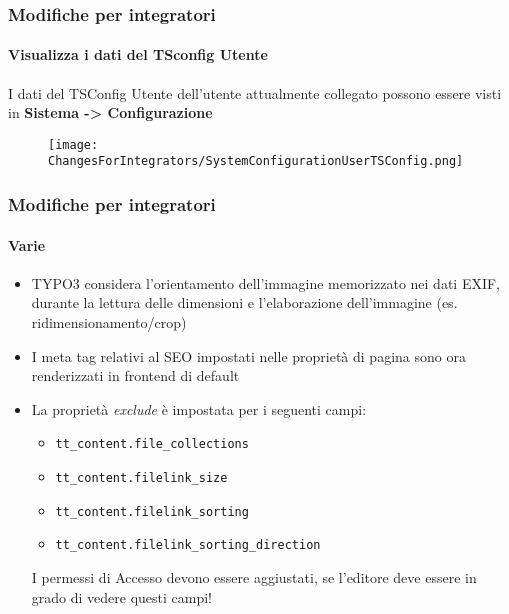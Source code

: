 
\begin{frame}[fragile]
	\frametitle{Modifiche per integratori}
	\framesubtitle{Visualizza i dati del TSconfig Utente}

	I dati del TSConfig Utente dell'utente attualmente collegato possono essere visti in
	\textbf{Sistema -> Configurazione}

	\begin{figure}
		\texttt{[image: ChangesForIntegrators/SystemConfigurationUserTSConfig.png]}
	\end{figure}

\end{frame}


\begin{frame}[fragile]
	\frametitle{Modifiche per integratori}
	\framesubtitle{Varie}

	\begin{itemize}
		\item TYPO3 considera l'orientamento dell'immagine memorizzato nei dati EXIF,
			durante la lettura delle dimensioni e l'elaborazione dell'immagine (es. ridimensionamento/crop)
		\item I meta tag relativi al SEO impostati nelle proprietà di pagina sono ora renderizzati
			in frontend di default
		\item La proprietà \textit{exclude} è impostata per i seguenti campi:

			\begin{itemize}
				\smaller
				\item \texttt{tt\_content.file\_collections}
				\item \texttt{tt\_content.filelink\_size}
				\item \texttt{tt\_content.filelink\_sorting}
				\item \texttt{tt\_content.filelink\_sorting\_direction}
			\end{itemize}

			\small
				I permessi di Accesso devono essere aggiustati, se l'editore deve essere in grado 
				di vedere questi campi!
			\normalsize

	\end{itemize}

\end{frame}

